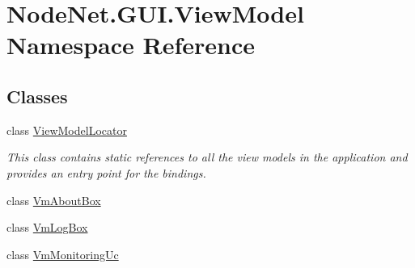 \hypertarget{namespace_node_net_1_1_g_u_i_1_1_view_model}{}\section{Node\+Net.\+G\+U\+I.\+View\+Model Namespace Reference}
\label{namespace_node_net_1_1_g_u_i_1_1_view_model}
\subsection*{Classes}
\begin{DoxyCompactItemize}
\item 
class \hyperlink{class_node_net_1_1_g_u_i_1_1_view_model_1_1_view_model_locator}{View\+Model\+Locator}
\begin{DoxyCompactList}\small\item\em This class contains static references to all the view models in the application and provides an entry point for the bindings. \end{DoxyCompactList}\item 
class \hyperlink{class_node_net_1_1_g_u_i_1_1_view_model_1_1_vm_about_box}{Vm\+About\+Box}
\item 
class \hyperlink{class_node_net_1_1_g_u_i_1_1_view_model_1_1_vm_log_box}{Vm\+Log\+Box}
\item 
class \hyperlink{class_node_net_1_1_g_u_i_1_1_view_model_1_1_vm_monitoring_uc}{Vm\+Monitoring\+Uc}
\end{DoxyCompactItemize}
